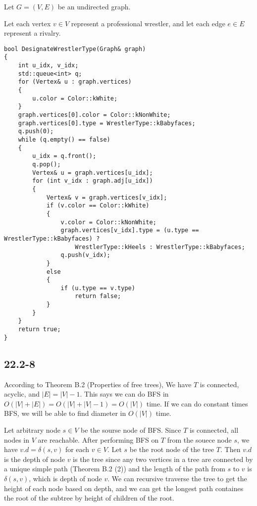 Let $G=(V,E)$ be an undirected graph.

Let each vertex $v \in V$ represent a professional wrestler,
and let each edge $e \in E$ represent a rivalry.

\begin{verbatim}
bool DesignateWrestlerType(Graph& graph)
{
    int u_idx, v_idx;
    std::queue<int> q;
    for (Vertex& u : graph.vertices)
    {
        u.color = Color::kWhite;
    }
    graph.vertices[0].color = Color::kNonWhite;
    graph.vertices[0].type = WrestlerType::kBabyfaces;
    q.push(0);
    while (q.empty() == false)
    {
        u_idx = q.front();
        q.pop();
        Vertex& u = graph.vertices[u_idx];
        for (int v_idx : graph.adj[u_idx])
        {
            Vertex& v = graph.vertices[v_idx];
            if (v.color == Color::kWhite)
            {
                v.color = Color::kNonWhite;
                graph.vertices[v_idx].type = (u.type == WrestlerType::kBabyfaces) ? 
                    WrestlerType::kHeels : WrestlerType::kBabyfaces;
                q.push(v_idx);
            }
            else
            {
                if (u.type == v.type)
                    return false;
            }
        }
    }
    return true;
}
\end{verbatim}

\subsection*{22.2-8}

According to Theorem B.2 (Properties of free trees),
We have $T$ is connected, acyclic, and $|E| = |V| - 1$.
This says we can do BFS in $O(|V| + |E|) = O(|V| + |V| - 1) = O(|V|)$ time.
If we can do constant times BFS, we will be able to find diameter in $O(|V|)$ time.

Let arbitrary node $s \in V$ be the sourse node of BFS.
Since $T$ is connected, all nodes in $V$ are reachable.
After performing BFS on $T$ from the souece node $s$,
we have $v.d = \delta(s,v)$ for each $v \in V$.
Let $s$ be the root node of the tree $T$.
Then $v.d$ is the depth of node $v$ is the tree
since any two vertices in a tree are connected by a unique simple path (Theorem B.2 (2))
and the length of the path from $s$ to $v$ is $\delta(s,v)$, which is depth of node $v$.
We can recursive traverse the tree to get the height of each node based on depth,
and we can get the longest path containes the root of the subtree by height of children of the root.

